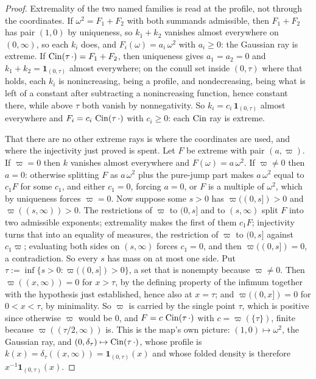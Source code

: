 \begin{proof}
Extremality of the two named families is read at the profile, not through the coordinates. If
$\omega^2 = F_1 + F_2$ with both summands admissible, then $F_1 + F_2$ has pair $(1,0)$ by
uniqueness, so $k_1 + k_2$ vanishes almost everywhere on $(0,\infty)$, so each $k_i$ does, and
$F_i(\omega) = a_i\,\omega^2$ with $a_i \ge 0$: the Gaussian ray is extreme. If
$\operatorname{Cin}(\tau\,\cdot) = F_1 + F_2$, then uniqueness gives $a_1 = a_2 = 0$ and
$k_1 + k_2 = \mathbf 1_{(0,\tau)}$ almost everywhere; on the conull set inside $(0,\tau)$ where
that holds, each $k_i$ is nonincreasing, being a profile, and nondecreasing, being what is left
of a constant after subtracting a nonincreasing function, hence constant there, while above
$\tau$ both vanish by nonnegativity. So $k_i = c_i\,\mathbf 1_{(0,\tau)}$ almost everywhere and
$F_i = c_i\,\operatorname{Cin}(\tau\,\cdot)$ with $c_i \ge 0$: each $\operatorname{Cin}$ ray is extreme.

That there are no other extreme rays is where the coordinates are used, and where the
injectivity just proved is spent. Let $F$ be extreme with pair $(a,\varpi)$. If $\varpi = 0$
then $k$ vanishes almost everywhere and $F(\omega) = a\,\omega^2$. If $\varpi \ne 0$ then
$a = 0$: otherwise splitting $F$ as $a\,\omega^2$ plus the pure-jump part makes $a\,\omega^2$
equal to $c_1F$ for some $c_1$, and either $c_1 = 0$, forcing $a = 0$, or $F$ is a multiple of
$\omega^2$, which by uniqueness forces $\varpi = 0$. Now suppose some $s > 0$ has
$\varpi((0,s]) > 0$ and $\varpi((s,\infty)) > 0$. The restrictions of $\varpi$ to $(0,s]$ and to
$(s,\infty)$ split $F$ into two admissible exponents; extremality makes the first of them
$c_1F$; injectivity turns that into an equality of measures, the restriction of $\varpi$ to
$(0,s]$ against $c_1\varpi$; evaluating both sides on $(s,\infty)$ forces $c_1 = 0$, and then
$\varpi((0,s]) = 0$, a contradiction. So every $s$ has mass on at most one side. Put
$\tau := \inf\{s > 0 : \varpi((0,s]) > 0\}$, a set that is nonempty because $\varpi \ne 0$.
Then $\varpi((x,\infty)) = 0$ for $x > \tau$, by the defining property of the infimum together
with the hypothesis just established, hence also at $x = \tau$; and $\varpi((0,x]) = 0$ for
$0 < x < \tau$, by minimality. So $\varpi$ is carried by the single point $\tau$, which is
positive since otherwise $\varpi$ would be $0$, and $F = c\,\operatorname{Cin}(\tau\,\cdot)$ with
$c = \varpi(\{\tau\})$, finite because $\varpi((\tau/2,\infty))$ is. This is the map's own
picture: $(1,0) \mapsto \omega^2$, the Gaussian ray, and
$(0,\delta_\tau) \mapsto \operatorname{Cin}(\tau\,\cdot)$, whose profile is
$k(x) = \delta_\tau((x,\infty)) = \mathbf 1_{(0,\tau)}(x)$ and whose folded \Levy{} density is
therefore $x^{-1}\mathbf 1_{(0,\tau)}(x)$.
\end{proof}


